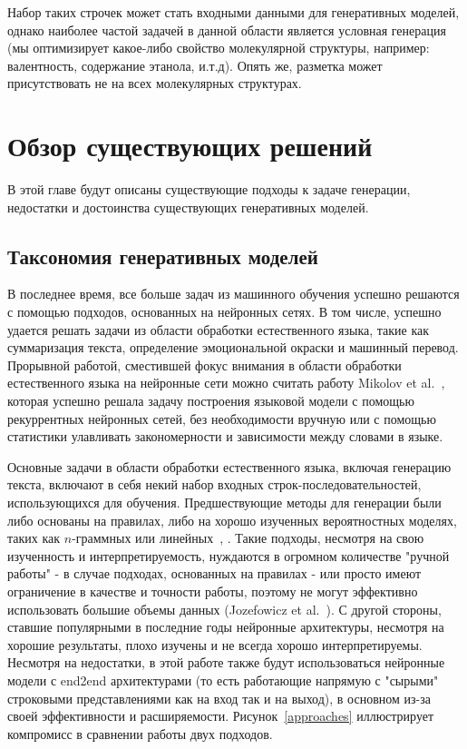 \documentclass{spbau-diploma}
\begin{document}
Набор таких строчек может стать входными данными для генеративных моделей, 
однако наиболее частой задачей в данной области является условная генерация (мы
оптимизирует какое-либо свойство молекулярной структуры, например: валентность, 
содержание этанола, и.т.д). Опять же, разметка может присутствовать не на всех
молекулярных структурах.

\section{Обзор существующих решений}
В этой главе будут описаны существующие подходы к задаче генерации, недостатки
и достоинства существующих генеративных моделей.

\subsection{Таксономия генеративных моделей}
В последнее время, все больше задач из машинного обучения успешно решаются с 
помощью подходов, основанных на нейронных сетях. В том числе, успешно удается
решать задачи из области обработки естественного языка, такие как суммаризация
текста, определение эмоциональной окраски и машинный перевод. Прорывной работой,
сместившей фокус внимания в области обработки естественного языка на нейронные
сети можно считать работу Mikolov et al.~\cite{rnnlm}, которая успешно решала
задачу построения языковой модели с помощью рекуррентных нейронных сетей, без
необходимости вручную или с помощью статистики улавливать закономерности и 
зависимости между словами в языке.

Основные задачи в области обработки естественного языка, включая генерацию 
текста, включают в себя некий набор входных строк-последовательностей, 
использующихся для обучения. Предшествующие методы для генерации были либо 
основаны на правилах, либо на хорошо изученных вероятностных моделях, таких как
$n$-граммных или линейных~\cite{statmodel1}, \cite{statmodel2}. Такие подходы,
несмотря на свою изученность и интерпретируемость, нуждаются в огромном 
количестве "ручной работы" - в случае подходах, основанных на правилах - или 
просто имеют ограничение в качестве и точности работы, поэтому не могут 
эффективно использовать большие объемы данных 
(Jozefowicz et al.~\cite{1602.02410}). С другой стороны, ставшие популярными в 
последние годы нейронные архитектуры, несмотря на хорошие результаты, плохо 
изучены и не всегда хорошо интерпретируемы. Несмотря на недостатки, в этой 
работе также будут использоваться нейронные модели с end2end архитектурами (то 
есть работающие напрямую с "сырыми" строковыми представлениями как на вход так 
и на выход), в основном из-за своей эффективности и расширяемости.
Рисунок~\ref{approaches} иллюстрирует компромисс в сравнении работы двух 
подходов.
\end{document}
